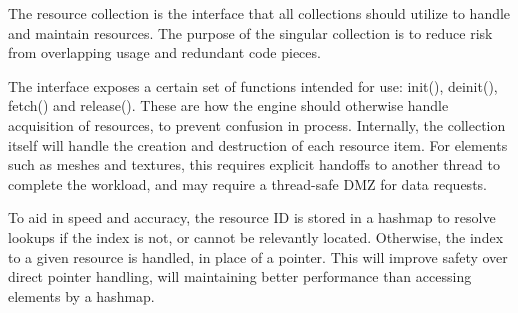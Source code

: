 The resource collection is the interface that all collections should utilize to handle and maintain resources. The purpose of the singular collection is to reduce risk from overlapping usage and redundant code pieces.

The interface exposes a certain set of functions intended for use: init(), deinit(), fetch() and release(). These are how the engine should otherwise handle acquisition of resources, to prevent confusion in process. Internally, the collection itself will handle the creation and destruction of each resource item. For elements such as meshes and textures, this requires explicit handoffs to another thread to complete the workload, and may require a thread-safe DMZ for data requests. 

To aid in speed and accuracy, the resource ID is stored in a hashmap to resolve lookups if the index is not, or cannot be relevantly located. Otherwise, the index to a given resource is handled, in place of a pointer. This will improve safety over direct pointer handling, will maintaining better performance than accessing elements by a hashmap.